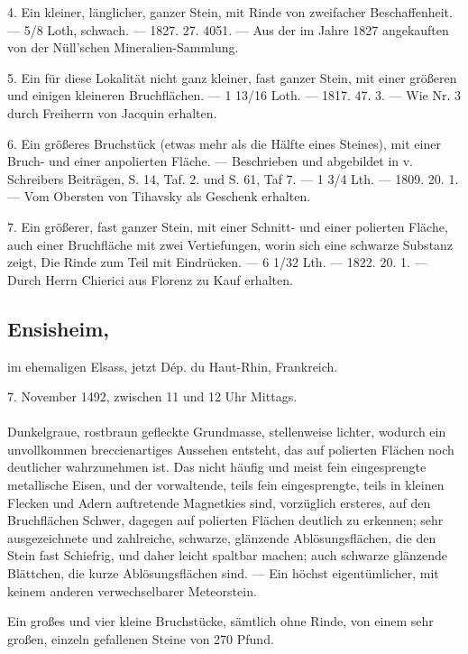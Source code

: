 \documentclass[a4paper, 11pt, oneside, polutonikogreek, german]{article}
\begin{document}
4. Ein kleiner, länglicher, ganzer Stein, mit Rinde von zweifacher Beschaffenheit. — 5/8 Loth, schwach. — 1827. 27. 4051. — Aus der im Jahre 1827 angekauften von der Nüll'schen Mineralien-Sammlung.

5. Ein für diese Lokalität nicht ganz kleiner, fast ganzer Stein, mit einer größeren und einigen kleineren Bruchflächen. — 1 13/16 Loth. — 1817. 47. 3. — Wie Nr. 3 durch Freiherrn von Jacquin erhalten.

6. Ein größeres Bruchstück (etwas mehr als die Hälfte eines Steines), mit einer Bruch- und einer anpolierten Fläche. — Beschrieben und abgebildet in v. Schreibers Beiträgen, S. 14, Taf. 2. und S. 61, Taf 7. — 1 3/4 Lth. — 1809. 20. 1. — Vom Obersten von Tihavsky als Geschenk erhalten.

7. Ein größerer, fast ganzer Stein, mit einer Schnitt- und einer polierten Fläche, auch einer Bruchfläche mit zwei Vertiefungen, worin sich eine schwarze Substanz zeigt, Die Rinde zum Teil mit Eindrücken. — 6 1/32 Lth. — 1822. 20. 1. — Durch Herrn Chierici aus Florenz zu Kauf erhalten.
\subsection[Ensisheim.]{Ensisheim,}
\begin{center}
\small
im ehemaligen Elsass, jetzt Dép. du Haut-Rhin, Frankreich.

7. November 1492, zwischen 11 und 12 Uhr Mittags.
\end{center}
\paragraph{}
Dunkelgraue, rostbraun gefleckte Grundmasse, stellenweise lichter, wodurch ein unvollkommen breccienartiges Aussehen entsteht, das auf polierten Flächen noch deutlicher wahrzunehmen ist. Das nicht häufig und meist fein eingesprengte metallische Eisen, und der vorwaltende, teils fein eingesprengte, teils in kleinen Flecken und Adern auftretende Magnetkies sind, vorzüglich ersteres, auf den Bruchflächen Schwer, dagegen auf polierten Flächen deutlich zu erkennen; sehr ausgezeichnete und zahlreiche, schwarze, glänzende Ablösungsflächen, die den Stein fast Schiefrig, und daher leicht spaltbar machen; auch schwarze glänzende Blättchen‚ die kurze Ablösungsflächen sind. — Ein höchst eigentümlicher, mit keinem anderen verwechselbarer Meteorstein.

Ein großes und vier kleine Bruchstücke, sämtlich ohne Rinde, von einem sehr großen, einzeln gefallenen Steine von 270 Pfund.
\end{document}
